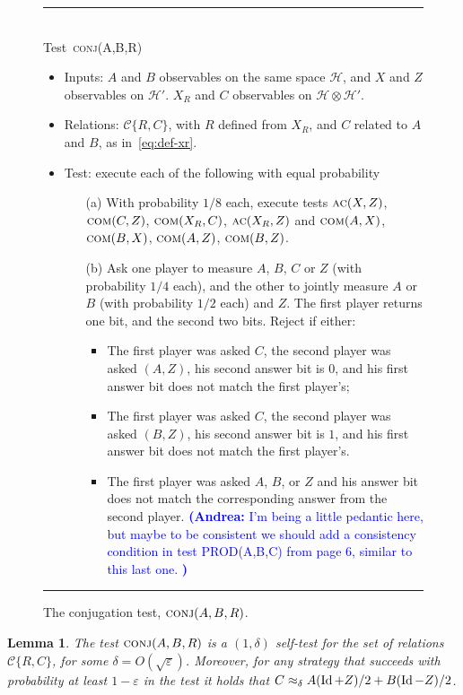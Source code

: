 \documentclass[11pt]{article}
\newtheorem{lemma}[theorem]{Lemma}
\theoremstyle{remark}
\theoremstyle{definition}
\newcommand{\Id}{\ensuremath{\mathop{\rm Id}\nolimits}}
\newcommand{\mH}{\mathcal{H}}
\newcommand{\eps}{\varepsilon}
\newcommand{\conj}{\textsc{conj}}
\newcommand{\comt}{\textsc{com}}
\newcommand{\act}{\textsc{ac}}
\newcommand{\anote}[1]{\textcolor{blue}{\small {\textbf{(Andrea:} #1 \textbf{) }}}}
\begin{document}
\begin{figure}[H]
\rule[1ex]{16.5cm}{0.5pt}\\
Test~\conj(A,B,R) 
\begin{itemize}
    \item Inputs: $A$ and $B$ observables on the same space $\mH$, and $X$ and $Z$ observables on $\mH'$. $X_R$ and $C$ observables on $\mH\otimes \mH'$.
    \item Relations:  $\mathcal{C}\{R,C\} $, with $R$ defined from $X_R$, and $C$ related to $A$ and $B$, as in~\eqref{eq:def-xr}. 
    \item Test: execute each of the following with equal probability
		\begin{enumerate}
\item[(a)] With probability $1/8$ each, execute tests $\act(X,Z)$,  $\comt(C,Z)$, $\comt(X_R,C)$,   $\act(X_R,Z)$ and $\comt(A,X)$, $\comt(B,X)$, $\comt(A,Z)$, $\comt(B,Z)$. 
\item[(b)] Ask one player to measure $A$, $B$, $C$ or $Z$ (with probability $1/4$ each), and the other to jointly measure $A$ or $B$ (with probability $1/2$ each) and $Z$. The first player returns one bit, and the second two bits. Reject if either:
\begin{itemize}
\item The first player was asked $C$, the second player was asked $(A,Z)$, his second answer bit is $0$, and his first answer bit does not match the first player's;
\item The first player was asked $C$, the second player was asked $(B,Z)$, his second answer bit is $1$, and his first answer bit does not match the first player's.
\item The first player was asked $A$, $B$, or $Z$ and his answer bit does not match the corresponding answer from the second player. \anote{I'm being a little pedantic here, but maybe to be consistent we should add a consistency condition in test PROD(A,B,C) from page 6, similar to this last one.}
\end{itemize}
\end{enumerate}
\end{itemize}
\rule[2ex]{16.5cm}{0.5pt}\vspace{-1cm}
\caption{The conjugation test, $\conj(A,B,R)$.}
\label{fig:conjugation-test-1}
\end{figure}

\begin{lemma}\label{lem:conj}
The test $\conj(A,B,R)$ is a $(1,\delta)$ self-test for the set of relations $\mathcal{C}\{R,C\}$, for some $\delta = O(\sqrt{\eps})$. Moreover, for any strategy that succeeds with probability at least $1-\eps$ in the test it holds that $C \approx_{\delta} A (\Id+Z)/2 + B(\Id-Z)/2$. 
\end{lemma}
\end{document}
